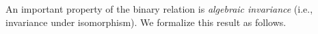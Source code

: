 An important property of the binary relation  is \emph{algebraic invariance} (i.e.,
invariance under isomorphism).  We formalize this result as follows.

\ifshort\else
\begin{code}%
\>[0]\<%
\\
\>[0]\AgdaSpace{}%
\AgdaModule{\AgdaUnderscore{}}\AgdaSpace{}%
\AgdaSymbol{\{}\AgdaSpace{}%
\AgdaSymbol{:}\AgdaSpace{}%
\AgdaSpace{}%
\AgdaSymbol{\}\{}\AgdaSpace{}%
\AgdaSymbol{:}\AgdaSpace{}%
\AgdaSpace{}%
\AgdaSpace{}%
\AgdaSymbol{\}(}\AgdaSpace{}%
\AgdaSymbol{:}\AgdaSpace{}%
\AgdaSpace{}%
\AgdaSpace{}%
\AgdaSymbol{)(}\AgdaSpace{}%
\AgdaSpace{}%
\AgdaSymbol{:}\AgdaSpace{}%
\AgdaSpace{}%
\AgdaSymbol{)}\AgdaSpace{}%
\<%
\end{code}
\fi
